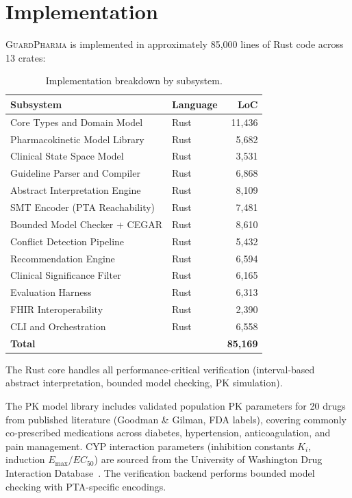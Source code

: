 \documentclass{article}
\theoremstyle{definition}
\begin{document}
\section{Implementation}
\label{sec:impl}

\textsc{GuardPharma} is implemented in approximately 85{,}000 lines of Rust code across 13 crates:

\begin{table}[H]
\centering
\caption{Implementation breakdown by subsystem.}
\label{tab:impl}
\begin{tabular}{@{}llr@{}}
\toprule
\textbf{Subsystem} & \textbf{Language} & \textbf{LoC} \\
\midrule
Core Types and Domain Model & Rust & 11{,}436 \\
Pharmacokinetic Model Library & Rust & 5{,}682 \\
Clinical State Space Model & Rust & 3{,}531 \\
Guideline Parser and Compiler & Rust & 6{,}868 \\
Abstract Interpretation Engine & Rust & 8{,}109 \\
SMT Encoder (PTA Reachability) & Rust & 7{,}481 \\
Bounded Model Checker + CEGAR & Rust & 8{,}610 \\
Conflict Detection Pipeline & Rust & 5{,}432 \\
Recommendation Engine & Rust & 6{,}594 \\
Clinical Significance Filter & Rust & 6{,}165 \\
Evaluation Harness & Rust & 6{,}313 \\
FHIR Interoperability & Rust & 2{,}390 \\
CLI and Orchestration & Rust & 6{,}558 \\
\midrule
\textbf{Total} & & \textbf{85{,}169} \\
\bottomrule
\end{tabular}
\end{table}

The Rust core handles all performance-critical verification (interval-based abstract interpretation, bounded model checking, PK simulation).

The PK model library includes validated population PK parameters for 20 drugs from published literature (Goodman \& Gilman, FDA labels), covering commonly co-prescribed medications across diabetes, hypertension, anticoagulation, and pain management. CYP interaction parameters (inhibition constants $K_i$, induction $E_{\max}/EC_{50}$) are sourced from the University of Washington Drug Interaction Database~\cite{uw_didb}. The verification backend performs bounded model checking with PTA-specific encodings.
\end{document}
